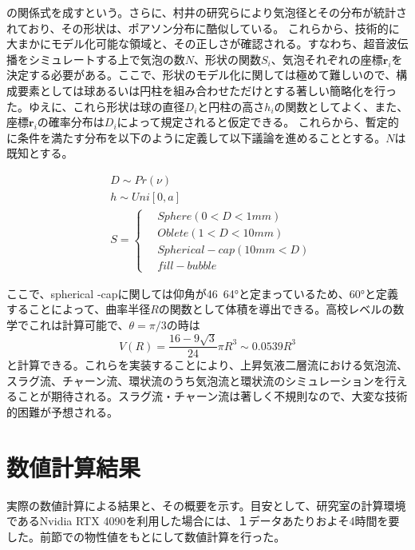 \documentclass[uplatex]{suribt}
\begin{document}
の関係式を成すという。さらに、村井の研究\cite{村井祐一20222022.T011}らにより気泡径とその分布が統計されており、その形状は、ポアソン分布に酷似している。
これらから、技術的に大まかにモデル化可能な領域と、その正しさが確認される。すなわち、超音波伝播をシミュレートする上で気泡の数$N$、形状の関数$S_i$、気泡それぞれの座標$\mathbf{r}_i$を決定する必要がある。ここで、形状のモデル化に関しては極めて難しいので、構成要素としては球あるいは円柱を組み合わせただけとする著しい簡略化を行った。ゆえに、これら形状は球の直径$D_i$と円柱の高さ$h_i$の関数としてよく、また、座標$\mathbf{r}_i$の確率分布は$D_i$によって規定されると仮定できる。
これらから、暫定的に条件を満たす分布を以下のように定義して以下議論を進めることとする。$N$は既知とする。

\begin{align}
    &D \sim Pr(\nu) \\
    &h \sim Uni[0,a] \\
    &S =\left\{ \,
    \begin{aligned}
        &Sphere  (0 < D < 1 mm) \\
        &Oblete (1< D <10 mm)\\
        &Spherical-cap (10mm< D )\\
        &fill-bubble 
    \end{aligned}
\right.
\end{align}\par
ここで、spherical -capに関しては仰角が46~64°と定まっているため、60°と定義することによって、曲率半径$R$の関数として体積を導出できる。高校レベルの数学でこれは計算可能で、$\theta=\pi/3$の時は
\begin{equation}
    V(R)=\frac{16-9\sqrt{3}}{24}\pi R^3\sim0.0539R^3
\end{equation}
と計算できる。これらを実装することにより、上昇気液二層流における気泡流、スラグ流、チャーン流、環状流のうち気泡流と環状流のシミュレーションを行えることが期待される。スラグ流・チャーン流は著しく不規則なので、大変な技術的困難が予想される。


\section{数値計算結果}
実際の数値計算による結果と、その概要を示す。目安として、研究室の計算環境であるNvidia RTX 4090を利用した場合には、１データあたりおよそ4時間を要した。前節での物性値をもとにして数値計算を行った。
\end{document}
